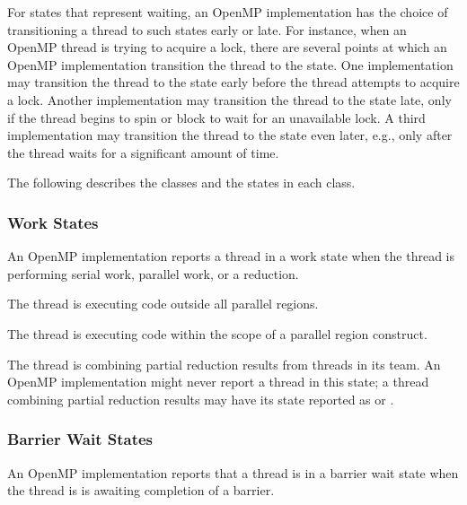For states that represent waiting, an OpenMP implementation has the 
choice of transitioning a thread to such states early or late.
For instance, when an OpenMP thread is trying to acquire a lock,
there are several points at which an OpenMP implementation
transition the thread to the  state.
One implementation may transition the thread to the state 
early before the thread attempts to acquire a
lock. Another implementation may transition the thread to the state 
late, only if the thread begins to spin or
block to wait for an unavailable lock. A third implementation
may transition the thread to the state even later, e.g., only
after the thread waits for a significant amount of time. 

The following describes the classes and the states in each class.
\subsubsection{Work States}
An OpenMP implementation reports a thread in a work state 
when the thread is performing serial work, parallel work, or a reduction.

\begin{description}

\item {} 

  The thread is executing code outside all parallel regions. 

\item {} 

  The thread is executing code within the scope of a parallel region construct.

\sloppy
\item {} 
 
  The thread is combining partial reduction results from threads in its team. 
  An OpenMP implementation  
  might never report a thread in this state; a thread
  combining partial reduction results may have its state reported as
   or .

\end{description}


\subsubsection{Barrier Wait States}

An OpenMP implementation reports that a thread is in a barrier wait state 
when the thread is is awaiting completion of a barrier.


